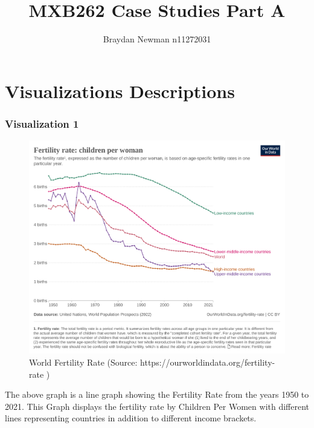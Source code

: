 \documentclass{article}
\begin{document}
\title{MXB262 Case Studies Part A}
\author{Braydan Newman n11272031}
\date{}
\maketitle

\pagebreak 

\tableofcontents{}

\pagebreak 

\section{Visualizations Descriptions}
\subsubsection{Visualization 1}
\begin{figure}[!htb]
\includegraphics[width=\textwidth]{children-per-woman-un (1).png} 
\caption{World Fertility Rate (Source: https://ourworldindata.org/fertility-rate )}

\end{figure}

The above graph is a line graph showing the Fertility Rate from the years 1950 to 2021. This Graph displays the fertility rate by Children Per Women with different lines representing countries in addition to different income brackets.

\pagebreak 
\end{document}
